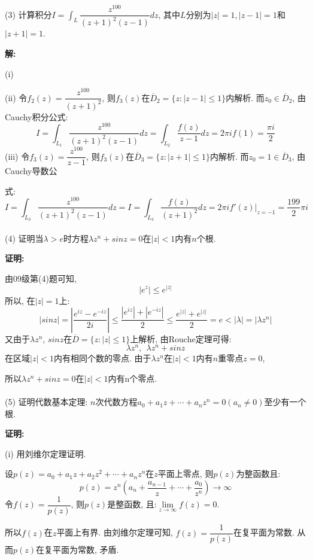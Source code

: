 \documentclass{article}
\begin{document}
(3) 计算积分$I = \displaystyle{\int_L \dfrac{z^{100}}{(z+1)^2(z-1)}dz}$, 其中$L$分别为$|z| = 1, |z-1| = 1$和$|z+1| = 1$. 

\textbf{解:} 

(i) 

(ii) 令$f_2(z) = \dfrac{z^{100}}{(z+1)^2}$, 则$f_3(z)$在$\overline{D}_2 = \{z: |z-1| \leq 1 \}$内解析. 而$z_0 \in \overline{D}_2$,  由Cauchy积分公式:
$$ I = \displaystyle{\int_{L_1} \dfrac{z^{100}}{(z+1)^2(z-1)}dz} = \displaystyle{\int_{L_2} \dfrac{f(z)}{z-1}dz} = 2\pi i f(1) = \dfrac{\pi i}{2}$$ 
(iii) 令$f_3(z) = \dfrac{z^{100}}{z-1}$, 则$f_3(z)$在$\overline{D}_3 = \{ z: |z+1| \leq 1 \}$内解析. 而$z_0 = 1 \in \overline{D}_3$, 由Cauchy导数公

\hspace{1.5em} 式:
$$ I = \displaystyle{\int_{L_3} \dfrac{z^{100}}{(z+1)^2(z-1)}dz} = I = \displaystyle{\int_{L_3} \dfrac{f(z)}{(z+1)^2}dz} = 2\pi i f'(z)|_{z=-1} = \dfrac{199}{2} \pi i $$ \\ 


(4) 证明当$\lambda > e$时方程$\lambda z^n + sinz = 0$在$|z| < 1$内有$n$个根. 

\textbf{证明:} 

由09级第(4)题可知, 
$$ |e^z| \leq e^{|z|} $$
所以, 在$|z|= 1 $上:
$$ |sinz| = |\dfrac{e^{iz} - e^{-iz}}{2i}| \leq \dfrac{|e^{iz}| + |e^{-iz}|}{2} \leq \dfrac{e^{|z|} + e^{|z|}}{2} = e < |\lambda| = |\lambda z^n| $$
又由于$\lambda z^n$, $sinz$在$\overline{D} = \{z: |z| \leq 1  \}$上解析, 由Rouche定理可得:
$$ \lambda z^n, \ \ \lambda z^n + sinz $$
在区域$|z|<1$内有相同个数的零点. 由于$\lambda z^n$在$|z|<1$内有$n$重零点$z = 0$,

所以$\lambda z^n + sinz = 0$在$|z|<1$内有n个零点. \\  \\ 


(5) 证明代数基本定理: $n$次代数方程$a_0 + a_1z + \cdots + a_n z^n =0(a_n \neq 0)$至少有一个根. 

\textbf{证明:} 

(i) 用刘维尔定理证明.

设$p(z) = a_0 + a_1z + a_2 z^2 + \cdots + a_n z^n$在$z$平面上零点, 则$p(z)$为整函数且:
$$ p(z) = z^n\left(a_n + \dfrac{a_{n-1}}{z} + \cdots + \dfrac{a_0}{z^n}  \right) \rightarrow \infty $$
令$f(z) = \dfrac{1}{p(z)}$, 则$p(z)$是整函数, 且:$\lim\limits_{z \rightarrow \infty} f(z) =0$. 

所以$f(z)$在$z$平面上有界. 由刘维尔定理可知, $f(z) = \dfrac{1}{p(z)}$在复平面为常数. 从而$p(z)$在复平面为常数, 矛盾.
\end{document}
